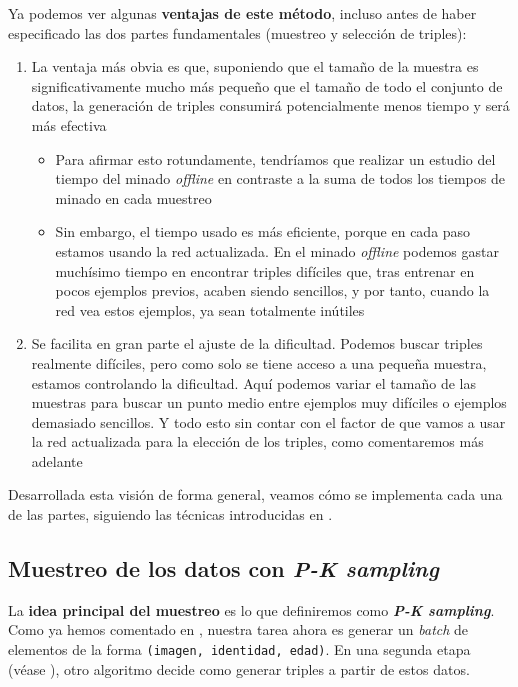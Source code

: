 Ya podemos ver algunas \textbf{ventajas de este método}, incluso antes de haber especificado las dos partes fundamentales (muestreo y selección de triples):

\begin{enumerate}
    \item La ventaja más obvia es que, suponiendo que el tamaño de la muestra es significativamente mucho más pequeño que el tamaño de todo el conjunto de datos, la generación de triples consumirá potencialmente menos tiempo y será más efectiva
        \begin{itemize}
            \item Para afirmar esto rotundamente, tendríamos que realizar un estudio del tiempo del minado \textit{offline} en contraste a la suma de todos los tiempos de minado en cada muestreo
            \item Sin embargo, el tiempo usado es más eficiente, porque en cada paso estamos usando la red actualizada. En el minado \textit{offline} podemos gastar muchísimo tiempo en encontrar triples difíciles que, tras entrenar en pocos ejemplos previos, acaben siendo sencillos, y por tanto, cuando la red vea estos ejemplos, ya sean totalmente inútiles
        \end{itemize}
    \item Se facilita en gran parte el ajuste de la dificultad. Podemos buscar triples realmente difíciles, pero como solo se tiene acceso a una pequeña muestra, estamos controlando la dificultad. Aquí podemos variar el tamaño de las muestras para buscar un punto medio entre ejemplos muy difíciles o ejemplos demasiado sencillos. Y todo esto sin contar con el factor de que vamos a usar la red actualizada para la elección de los triples, como comentaremos más adelante
\end{enumerate}

Desarrollada esta visión de forma general, veamos cómo se implementa cada una de las partes, siguiendo las técnicas introducidas en \cite{informatica:principal}.

\subsection{Muestreo de los datos con \textit{P-K sampling}} \label{isubs:muestreo_datos_pk_sampling_teoria}

La \textbf{idea principal del muestreo} es lo que definiremos como \textbf{\textit{P-K sampling}}. Como ya hemos comentado en , nuestra tarea ahora es generar un \textit{batch} de elementos de la forma \lstinline{(imagen, identidad, edad)}. En una segunda etapa (véase ), otro algoritmo decide como generar triples a partir de estos datos.

